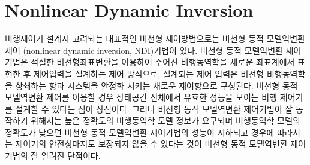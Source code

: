 \documentclass[a4paper, 12pt]{report}
\begin{document}
	\section{Nonlinear Dynamic Inversion}
	비행제어기 설계시 고려되는 대표적인 비선형 제어방법으로는 비선형 동적 모델역변환 제어 (nonlinear dynamic inversion, NDI)기법이 있다. 비선형 동적 모델역변환 제어 기법은 적절한 비선형좌표변환을 이용하여 주어진 비행동역학을 새로운 좌표계에서 표현한 후 제어입력을 설계하는 제어 방식으로, 설계되는 제어 입력은 비선형 비행동역학을 상쇄하는 항과 시스템을 안정화 시키는 새로운 제어항으로 구성된다. 비선형 동적 모델역변환 제어를 이용할 경우 상태공간 전체에서 유효한 성능을 보이는 비행 제어기를 설계할 수 있다는 점이 장점이다. 그러나 비선형 동적 모델역변환 제어기법이 잘 동작하기 위해서는 높은 정확도의 비행동역학 모델 정보가 요구되며 비행동역학 모델의 정확도가 낮으면 비선형 동적 모델역변환 제어기법의 성능이 저하되고 경우에 따라서는 제어기의 안전성마저도 보장되지 않을 수 있다는 것이 비선형 동적 모델역변환 제어기법의 잘 알려진 단점이다.
	
\end{document}
